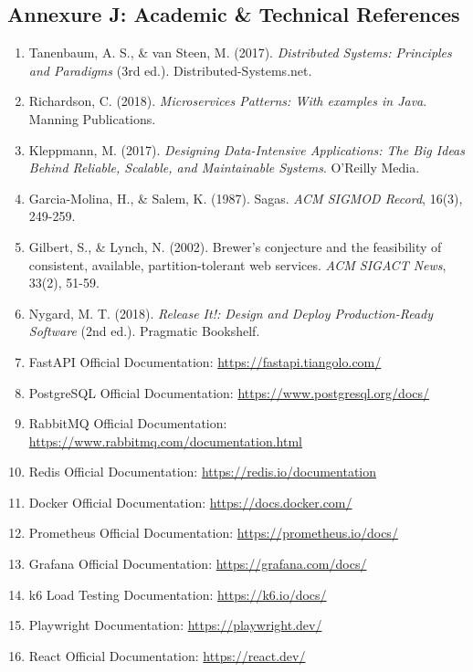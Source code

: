 \documentclass[11pt,a4paper]{article}
\begin{document}
\subsection{Annexure J: Academic \& Technical References}
\begin{enumerate}
    \item Tanenbaum, A. S., \& van Steen, M. (2017). \textit{Distributed Systems: Principles and Paradigms} (3rd ed.). Distributed-Systems.net.
    \item Richardson, C. (2018). \textit{Microservices Patterns: With examples in Java}. Manning Publications.
    \item Kleppmann, M. (2017). \textit{Designing Data-Intensive Applications: The Big Ideas Behind Reliable, Scalable, and Maintainable Systems}. O'Reilly Media.
    \item Garcia-Molina, H., \& Salem, K. (1987). Sagas. \textit{ACM SIGMOD Record}, 16(3), 249-259.
    \item Gilbert, S., \& Lynch, N. (2002). Brewer's conjecture and the feasibility of consistent, available, partition-tolerant web services. \textit{ACM SIGACT News}, 33(2), 51-59.
    \item Nygard, M. T. (2018). \textit{Release It!: Design and Deploy Production-Ready Software} (2nd ed.). Pragmatic Bookshelf.
    \item FastAPI Official Documentation: \url{https://fastapi.tiangolo.com/}
    \item PostgreSQL Official Documentation: \url{https://www.postgresql.org/docs/}
    \item RabbitMQ Official Documentation: \url{https://www.rabbitmq.com/documentation.html}
    \item Redis Official Documentation: \url{https://redis.io/documentation}
    \item Docker Official Documentation: \url{https://docs.docker.com/}
    \item Prometheus Official Documentation: \url{https://prometheus.io/docs/}
    \item Grafana Official Documentation: \url{https://grafana.com/docs/}
    \item k6 Load Testing Documentation: \url{https://k6.io/docs/}
    \item Playwright Documentation: \url{https://playwright.dev/}
    \item React Official Documentation: \url{https://react.dev/}
\end{enumerate}
\end{document}
